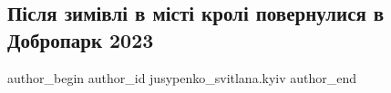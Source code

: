  
 
 
 
 
 
\subsection{Після зимівлі в місті кролі повернулися в Добропарк 2023}
\label{sec:03_05_2023.fb.jusypenko_svitlana.kyiv.1.kroli_povernulys_v_dobropark}
 
\ifcmt
 author_begin
   author_id jusypenko_svitlana.kyiv
 author_end
\fi

